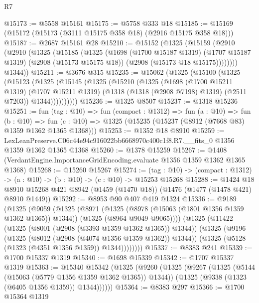 \begin{lexlean}{R7}
\begin{coremodule}
@15173 := @5558 @15161
@15175 := @5758 @333 @18
@15185 := @15169 (@15172 (@15173 (@3111 @15175 @358 @18) (@2916 @15175 @358 @18)))
@15187 := @2687 @15161 @28
@15210 := @15152
    (@1325
      (@15159
        (@2910
          (@2910
            (@1325
              (@15185
                (@1325
                  (@1698
                    (@1700 @15187 @1319)
                    (@1707 @15187 @1319)
                    (@2908 (@15173 @15175 @18))
                    (@2908 (@15173 @18 @15175))))))))
        @1344))
@15211 := @3676 @315
@15235 := @15062
    (@1325
      (@15100
        (@1325
          (@15123
            (@1325
              (@15145
                (@1325
                  (@15210
                    (@1325
                      (@1698
                        (@1700 @15211 @1319)
                        (@1707 @15211 @1319)
                        (@1318 (@1318 (@2908 @7198) @1319) (@2511 @7203))
                        @1344))))))))))
@15236 := @1325 @8507
@15237 := @1318 @15236
@15251 := fun (tag : @10) =>
  fun (compact : @1312) =>
  fun (a : @10) =>
  fun (b : @10) =>
  fun (c : @10) => @1325 (@15235 (@15237 (@8912 (@7668 @83) @1359 @1362 @1365 @1368)))
@15253 := @1352 @18 @8910
@15259 := LexLeanPreserve.C06c44e94c916022bb6668970c400c1f8.R7.__fits_0
    @1356
    @1359
    @1362
    @1365
    @1368
@15260 := @1378 @15259
@15267 := @1408 (VerdantEngine.ImportanceGridEncoding.evaluate @1356 @1359 @1362 @1365 @1368)
@15268 := @15260 @15267
@15274 := (tag : @10) -> (compact : @1312) -> (a : @10) -> (b : @10) -> (c : @10) -> @15253 @15268
@15288 := @1424
    @18
    @8910
    @15268
    @421
    @8942
    (@1459 (@1470 @18))
    (@1476 (@1477 (@1478 @421) @8910 @1449))
@15292 := @8953 @90 @407 @419 @1324
@15336 := @9189
    (@1325
      (@9059
        (@1325
          (@8971
            (@1325 (@8978 (@15063 (@1801 @1356 @1359 @1362 @1365)) @1344))
            (@1325 (@8964 @9049 @9065))))
        (@1325
          (@11422
            (@1325 (@8001 (@2908 (@3393 @1359 @1362 @1365)) @1344))
            (@1325
              (@9196
                (@1325 (@8012 (@2908 (@4074 @1356 @1359 @1362)) @1344))
                (@1325 (@5128 (@1323 (@4351 @1356 @1359)) @1344))))))))
@15337 := @8383 @241
@15339 := @1700 @15337 @1319
@15340 := @1698 @15339
@15342 := @1707 @15337 @1319
@15363 := @15340
    @15342
    (@1325
      (@9260
        (@1325
          (@9267
            (@1325 (@5144 (@15063 (@5779 @1356 @1359 @1362 @1365)) @1344))
            (@1325 (@9338 (@1323 (@6405 @1356 @1359)) @1344))))))
@15364 := @8383 @297
@15366 := @1700 @15364 @1319

\end{coremodule}
\end{lexlean}

